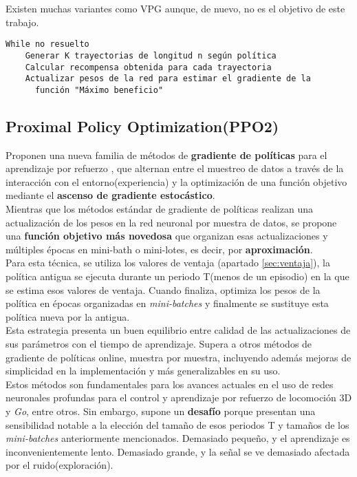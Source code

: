 \documentclass[11pt,fleqn]{book} %
\begin{document}
Existen muchas variantes como VPG aunque, de nuevo, no es el objetivo de este trabajo.\\

\begin{verbatim}
While no resuelto
    Generar K trayectorias de longitud n según política
    Calcular recompensa obtenida para cada trayectoria
    Actualizar pesos de la red para estimar el gradiente de la
      función "Máximo beneficio"
\end{verbatim}

\subsection{Proximal Policy Optimization(PPO2)}

Proponen una nueva familia de métodos de \textbf{gradiente de políticas} para el aprendizaje por refuerzo , que alternan entre el muestreo de datos a través de la interacción con el entorno(experiencia) y la optimización de una función objetivo mediante el \textbf{ascenso de gradiente estocástico}. \\

Mientras que los métodos estándar de gradiente de políticas realizan una actualización de los pesos en la red neuronal por muestra de datos, se propone una \textbf{función objetivo más novedosa} que organizan esas actualizaciones y múltiples épocas en mini-bath o mini-lotes, es decir, por \textbf{aproximación}. \\

Para esta técnica, se utiliza los valores de ventaja (apartado \ref{sec:ventaja}), la política antigua se ejecuta durante un periodo T(menos de un episodio) en la que se estima esos valores de ventaja. Cuando finaliza, optimiza los pesos de la política en épocas organizadas en \textit{mini-batches} y finalmente se sustituye esta política nueva por la antigua. \\

Esta estrategia presenta un buen equilibrio entre calidad de las actualizaciones de sus parámetros con el tiempo de aprendizaje. Supera a otros métodos de gradiente de políticas online, muestra por muestra, incluyendo además mejoras de simplicidad en la implementación y más generalizables en su uso. \\

Estos métodos son fundamentales para los avances actuales en el uso de redes neuronales profundas para el control y aprendizaje por refuerzo de locomoción 3D y \textit{Go}, entre otros. Sin embargo, supone un \textbf{desafío} porque presentan una sensibilidad notable a la elección del tamaño de esos periodos T y tamaños de los \textit{mini-batches} anteriormente mencionados. Demasiado pequeño, y el aprendizaje es inconvenientemente lento. Demasiado grande, y la señal se ve demasiado afectada por el ruido(exploración). \\
\end{document}
